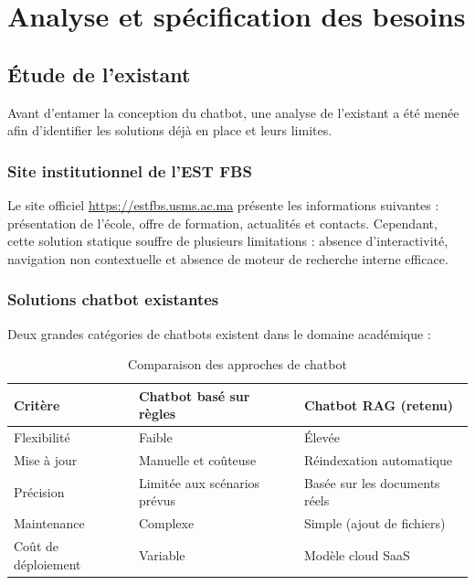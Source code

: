 \documentclass[12pt, a4paper, twoside]{report}
\begin{document}
\cleardoublepage

\chapter{Analyse et spécification des besoins}

\section{Étude de l'existant}

Avant d'entamer la conception du chatbot, une analyse de l'existant a été menée afin d'identifier les solutions déjà en place et leurs limites.

\subsection{Site institutionnel de l'EST FBS}

Le site officiel \url{https://estfbs.usms.ac.ma} présente les informations suivantes : présentation de l'école, offre de formation, actualités et contacts. Cependant, cette solution statique souffre de plusieurs limitations : absence d'interactivité, navigation non contextuelle et absence de moteur de recherche interne efficace.

\subsection{Solutions chatbot existantes}

Deux grandes catégories de chatbots existent dans le domaine académique :

\begin{table}[H]
\centering
\caption{Comparaison des approches de chatbot}
\label{tab:comparaison-chatbots}
\begin{tabularx}{\textwidth}{l X X}
\toprule
\rowcolor{primary!10}
\textbf{Critère} & \textbf{Chatbot basé sur règles} & \textbf{Chatbot RAG (retenu)} \\
\midrule
Flexibilité & Faible & Élevée \\
Mise à jour & Manuelle et coûteuse & Réindexation automatique \\
Précision & Limitée aux scénarios prévus & Basée sur les documents réels \\
Maintenance & Complexe & Simple (ajout de fichiers) \\
Coût de déploiement & Variable & Modèle cloud SaaS \\
\bottomrule
\end{tabularx}
\end{table}
\end{document}
